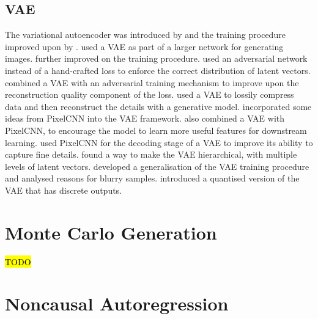\documentclass[11pt, a4paper, openany]{book}
\begin{document}
\subsection{VAE}

The variational autoencoder was introduced by \citet{vae} and the training procedure improved upon by \citet{vae2}. \citet{drawvae} used a VAE as part of a larger network for generating images. \citet{vaeflows} further improved on the training procedure. \citet{adversarialvae} used an adversarial network instead of a hand-crafted loss to enforce the correct distribution of latent vectors. \citet{vaegan} combined a VAE with an adversarial training mechanism to improve upon the reconstruction quality component of the loss. \citet{vaecompression} used a VAE to lossily compress data and then reconstruct the details with a generative model. \citet{vaeiaf} incorporated some ideas from PixelCNN into the VAE framework. \citet{vaelossy} also combined a VAE with PixelCNN, to encourage the model to learn more useful features for downstream learning. \citet{pixelvae} used PixelCNN for the decoding stage of a VAE to improve its ability to capture fine details. \citet{vaehieararchy} found a way to make the VAE hierarchical, with multiple levels of latent vectors. \citet{vaeunderstanding} developed a generalisation of the VAE training procedure and analysed reasons for blurry samples.  introduced a quantised version of the VAE that has discrete outputs.

\section{Monte Carlo Generation}

\hl{TODO}
\citet{brnndenoise}

\section{Noncausal Autoregression}
\end{document}
